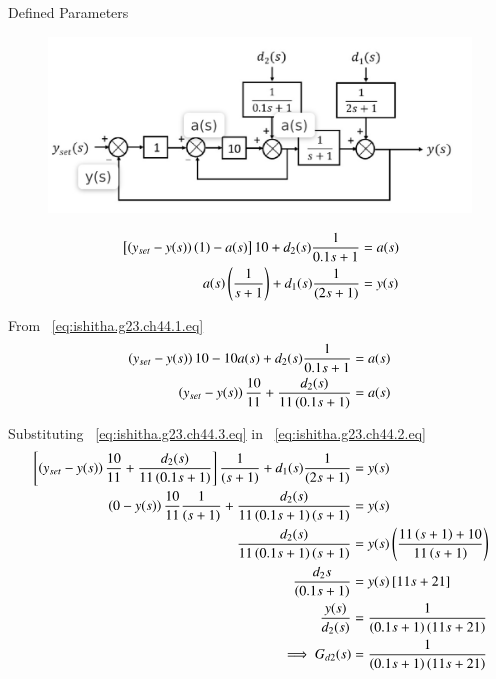 \documentclass[journal,12pt,onecolumn]{IEEEtran}
\theoremstyle{remark}
\begin{document}
\begin{table}[!ht]
    \centering
        
    \caption{Defined Parameters}
    \label{tab: ishithagatech44.t2}
\end{table}

\begin{figure}[h]
    \centering
    \includegraphics[scale=0.30]{../gate23.ch.44/figs/g44fig2.jpeg}
    \caption{ }
    \label{}
\end{figure}

\newpage

\begin{align}
{}\left[\left(y_{set}-y(s)\right)(1) -a(s)\right]10+ d_2(s)\frac{1}{0.1s+1} &=a(s)  \label{eq:ishitha.g23.ch44.1.eq} \\
a(s)\left(\frac{1}{s+1}\right) + d_1(s)\frac{1}{(2s+1)} &=y(s)  \label{eq:ishitha.g23.ch44.2.eq}
\end{align}

From ~\eqref{eq:ishitha.g23.ch44.1.eq}
\begin{align}
\left(y_{set}-y(s)\right)10 -10a(s) + d_2(s)\frac{1}{0.1s+1}&=a(s) \\
\left(y_{set}-y(s)\right)\frac{10}{11} + \frac{d_2(s)}{11\left(0.1s+1\right)} &= a(s)  \label{eq:ishitha.g23.ch44.3.eq}
\end{align}

Substituting ~\eqref{eq:ishitha.g23.ch44.3.eq} in ~\eqref{eq:ishitha.g23.ch44.2.eq}
\begin{align}
{}\left[\left(y_{set}-y(s)\right)\frac{10}{11} + \frac{d_2(s)}{11\left(0.1s+1\right)}  \right]\frac{1}{\left(s+1\right)}+ d_1(s)\frac{1}{(2s+1)} &= y(s) \\
\left(0-y(s)\right)\frac{10}{11}\frac{1}{\left(s+1\right)} + \frac{d_2(s)}{11\left(0.1s+1\right)\left(s+1\right)} &= y(s) \\
\frac{d_2(s)}{11\left(0.1s+1\right)\left(s+1\right)} &= y(s)\left(\frac{11\left(s+1\right)+10}{11\left(s+1\right)}\right) \\
\frac{d_2{s}}{\left(0.1s+1\right)} &= y(s){}\left[11s+21\right] \\
\frac{y(s)}{d_2(s)} &= \frac{1}{\left(0.1s+1\right)\left(11s+21\right)} \\
\implies G_{d2}(s) &= \frac{1}{\left(0.1s+1\right)\left(11s+21\right)}
\end{align}
\end{document}
